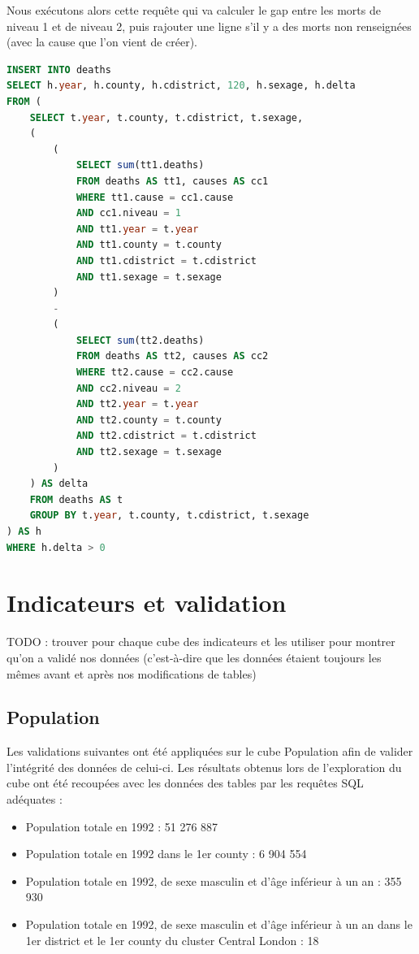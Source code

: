     Nous exécutons alors cette requête qui va calculer le gap entre les morts de niveau 1 et de niveau 2, puis rajouter une ligne
    s'il y a des morts non renseignées (avec la cause que l'on vient de créer).

    \begin{lstlisting}[frame=single, language=SQL]
INSERT INTO deaths
SELECT h.year, h.county, h.cdistrict, 120, h.sexage, h.delta
FROM (
    SELECT t.year, t.county, t.cdistrict, t.sexage,
    (
        (
            SELECT sum(tt1.deaths)
            FROM deaths AS tt1, causes AS cc1
            WHERE tt1.cause = cc1.cause
            AND cc1.niveau = 1
            AND tt1.year = t.year
            AND tt1.county = t.county
            AND tt1.cdistrict = t.cdistrict
            AND tt1.sexage = t.sexage
        )
        -
        (
            SELECT sum(tt2.deaths)
            FROM deaths AS tt2, causes AS cc2
            WHERE tt2.cause = cc2.cause
            AND cc2.niveau = 2
            AND tt2.year = t.year
            AND tt2.county = t.county
            AND tt2.cdistrict = t.cdistrict
            AND tt2.sexage = t.sexage
        )
    ) AS delta
    FROM deaths AS t
    GROUP BY t.year, t.county, t.cdistrict, t.sexage
) AS h
WHERE h.delta > 0
    \end{lstlisting}

\pagebreak

\chapter{Indicateurs et validation}

TODO : trouver pour chaque cube des indicateurs et les utiliser pour montrer qu'on a validé nos données (c'est-à-dire que les données étaient toujours les mêmes avant et après nos modifications de tables)

\section{Population}
Les validations suivantes ont été appliquées sur le cube Population afin de valider l'intégrité des données de celui-ci. Les résultats obtenus lors de l'exploration du cube ont été recoupées avec les données des tables par les requêtes SQL adéquates :
\begin{itemize}
    \item Population totale en 1992 : 51 276 887
    \item Population totale en 1992 dans le 1er county : 6 904 554
    \item Population totale en 1992, de sexe masculin et d'âge inférieur à un an : 355 930
    \item Population totale en 1992, de sexe masculin et d'âge inférieur à un an dans le 1er district et le 1er county du cluster Central London : 18
\end{itemize}


\pagebreak
